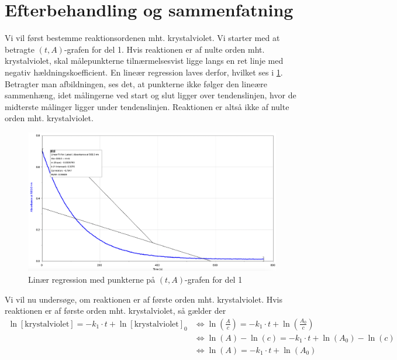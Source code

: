 \documentclass{report}
\begin{document}
\section*{Efterbehandling og sammenfatning}
Vi vil først bestemme reaktionsordenen mht. krystalviolet.
Vi starter med at betragte $(t,A)$-grafen for del 1.
Hvis reaktionen er af nulte orden mht. krystalviolet, skal målepunkterne tilnærmelsesvist ligge langs en ret linje med negativ hældningskoefficient.
En lineær regression laves derfor, hvilket ses i \cref{fig:tA}.
Betragter man afbildningen, ses det, at punkterne ikke følger den lineære sammenhæng, idet målingerne ved start og slut ligger over tendenslinjen, hvor de midterste målinger ligger under tendenslinjen.
Reaktionen er altså ikke af nulte orden mht. krystalviolet.
\begin{figure}[H]
\begin{center}
  \includegraphics[width=\textwidth]{tA.png}
\end{center}
  \caption{Linær regression med punkterne på $(t,A)$-grafen for del 1}
\label{fig:tA}
\end{figure}
Vi vil nu undersøge, om reaktionen er af første orden mht. krystalviolet.
Hvis reaktionen er af første orden mht. krystalviolet, så gælder der 
\begin{equation}
\begin{split}
  \ln\left[\text{krystalviolet} \right]=-k_1 \cdot t + \ln\left[\text{krystalviolet} \right]_0 &\iff \ln \left( \frac{A}{c}\right)=-k_1 \cdot t + \ln\left(\frac{A_0}{c}\right) \\
  &\iff \ln\left(A\right) - \ln\left(c\right) =-k_1 \cdot t + \ln\left(A_0\right) - \ln\left(c\right) \\
  &\iff \ln\left(A\right) =-k_1 \cdot t + \ln\left(A_0\right) 
\end{split}
  \label{eq:lnA}
\end{equation}
\end{document}
